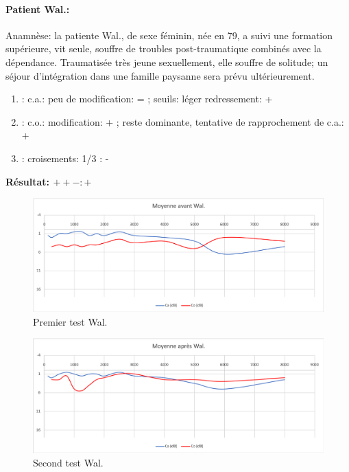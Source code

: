 \paragraph{ Patient Wal.:}

Anamnèse: la patiente Wal., de sexe féminin, née en 79, a suivi une formation supérieure, vit seule,  
souffre de troubles post-traumatique combinés avec la dépendance. Traumatisée très jeune 
sexuellement, elle souffre de solitude;  un séjour d'intégration dans une famille paysanne sera prévu 
ultérieurement.
	\begin{enumerate}

 		\item : c.a.: peu de modification: = ;  seuils: léger redressement: +

 		\item : c.o.:  modification:  + ; reste dominante, tentative de rapprochement de c.a.: +
 		\item : croisements: 1/3 :  -

                \end{enumerate}

                \textbf{ Résultat:  $ + +  -        : +$ }
\begin{figure}[th]
	\centering
	\includegraphics[width=1\linewidth]{images/graphiques/wal_pre.png}
	\caption[Patient Wal. :1° test]{Premier test Wal.}
	
\end{figure}
               \begin{figure}%
\centering
\includegraphics[width=1\linewidth]{images/graphiques/wal_post.png}
\caption[Patient Wal. : 2° test]{Second test Wal.}

\label{groupecontroleimage1}
\end{figure}


